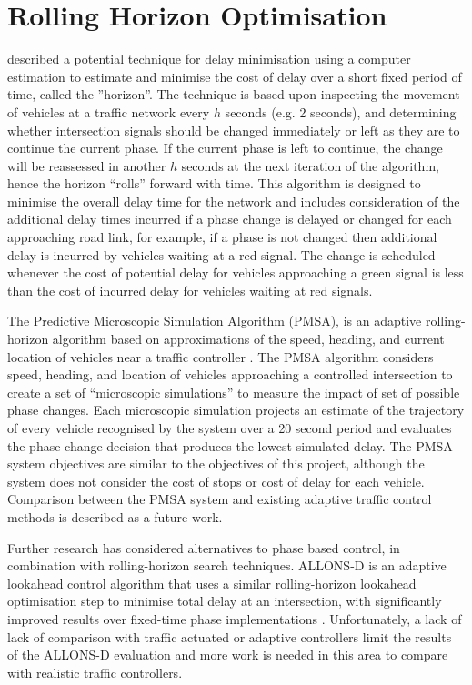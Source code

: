 \section{Rolling Horizon Optimisation}
\label{bg:rolling-horizon}

 described a potential technique for delay minimisation using a computer estimation to estimate and minimise the cost of delay over a short fixed period of time, called the ''horizon''. The technique is based upon inspecting the movement of vehicles at a traffic network every $h$ seconds (e.g. 2 seconds), and determining whether intersection signals should be changed immediately or left as they are to continue the current phase. If the current phase is left to continue, the change will be reassessed in another $h$ seconds at the next iteration of the algorithm, hence the horizon ``rolls'' forward with time. This algorithm is designed to minimise the overall delay time for the network and includes consideration of the additional delay times incurred if a phase change is delayed or changed for each approaching road link, for example, if a phase is not changed then additional delay is incurred by vehicles waiting at a red signal. The change is scheduled whenever the cost of potential delay for vehicles approaching a green signal is less than the cost of incurred delay for vehicles waiting at red signals.

The Predictive Microscopic Simulation Algorithm (PMSA), is an adaptive rolling-horizon algorithm based on approximations of the speed, heading, and current location of vehicles near a traffic controller \cite{smith2010intellidrive}. The PMSA algorithm considers speed, heading, and location of vehicles approaching a controlled intersection to create a set of ``microscopic simulations'' to measure the impact of set of possible phase changes. Each microscopic simulation projects an estimate of the trajectory of every vehicle recognised by the system over a 20 second period and evaluates the phase change decision that produces the lowest simulated delay. The PMSA system objectives are similar to the objectives of this project, although the system does not consider the cost of stops or cost of delay for each vehicle. Comparison between the PMSA system and existing adaptive traffic control methods is described as a future work.

Further research has considered alternatives to phase based control, in combination with rolling-horizon search techniques.  ALLONS-D is an adaptive lookahead control algorithm that uses a similar rolling-horizon lookahead optimisation step to minimise total delay at an intersection, with significantly improved results over fixed-time phase implementations \cite{porche1996allonsd}. Unfortunately, a lack of  lack of comparison with traffic actuated or adaptive controllers limit the results of the ALLONS-D evaluation and more work is needed in this area to compare with realistic traffic controllers. 

